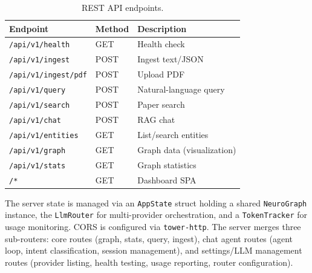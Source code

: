 \documentclass[11pt,twocolumn]{article}
\begin{document}
\begin{table}[h]
\centering\scriptsize
\begin{tabular}{@{}lll@{}}
\toprule
\textbf{Endpoint} & \textbf{Method} & \textbf{Description} \\
\midrule
\texttt{/api/v1/health} & GET & Health check \\
\texttt{/api/v1/ingest} & POST & Ingest text/JSON \\
\texttt{/api/v1/ingest/pdf} & POST & Upload PDF \\
\texttt{/api/v1/query} & POST & Natural-language query \\
\texttt{/api/v1/search} & POST & Paper search \\
\texttt{/api/v1/chat} & POST & RAG chat \\
\texttt{/api/v1/entities} & GET & List/search entities \\
\texttt{/api/v1/graph} & GET & Graph data (visualization) \\
\texttt{/api/v1/stats} & GET & Graph statistics \\
\texttt{/*} & GET & Dashboard SPA \\
\bottomrule
\end{tabular}
\caption{REST API endpoints.}
\end{table}

The server state is managed via an \texttt{AppState} struct holding a shared \texttt{NeuroGraph} instance, the \texttt{LlmRouter} for multi-provider orchestration, and a \texttt{TokenTracker} for usage monitoring. CORS is configured via \texttt{tower-http}. The server merges three sub-routers: core routes (graph, stats, query, ingest), chat agent routes (agent loop, intent classification, session management), and settings/LLM management routes (provider listing, health testing, usage reporting, router configuration).
\end{document}
